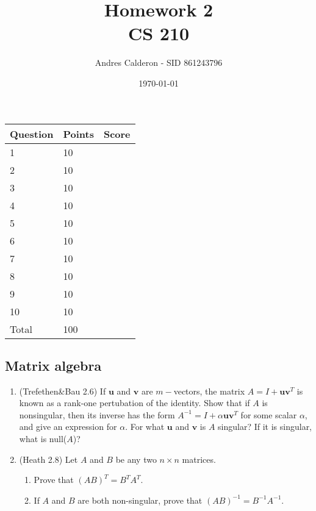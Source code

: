\documentclass{article}
\title{Homework 2\\CS 210}
\author{Andres Calderon - SID 861243796}
\date{\today}
\renewcommand{\vec}[1]{\mathbf{#1}}
\begin{document}
\maketitle

\begin{center}
\begin{tabular}{|l|l|p{.4in}|}
\hline Question & Points & Score \\
\hline 1 & 10 & \\
\hline 2 & 10 & \\
\hline 3 & 10 & \\
\hline 4 & 10 & \\
\hline 5 & 10 & \\
\hline 6 & 10 & \\
\hline 7 & 10 & \\
\hline 8 & 10 & \\
\hline 9 & 10 & \\
\hline 10 & 10 & \\
\hline Total & 100 & \\
\hline 
\end{tabular}
\end{center}

\subsection*{Matrix algebra}
\begin{enumerate}
\setcounter{enumi}{0}
\item (Trefethen\&Bau 2.6) If $\vec{u}$ and $\vec{v}$ are $m-$vectors, the matrix $A = I+\vec{u}\vec{v}^T$ is known as a rank-one
  pertubation of the identity.  Show that if $A$ is nonsingular, then its inverse has the form $A^{-1} = I + \alpha
  \vec{u} \vec{v}^T$ for some scalar $\alpha$, and give an expression for $\alpha$.  For what $\vec{u}$ and $\vec{v}$ is
  $A$ singular?  If it is singular, what is null($A$)?
\item (Heath 2.8) Let $A$ and $B$ be any two $n \times n$ matrices.
\begin{enumerate}
\item Prove that $(AB)^T=B^TA^T$.
\item If $A$ and $B$ are both non-singular, prove that $(AB)^{-1} = B^{-1}A^{-1}$.
\end{enumerate}
\end{enumerate}
\end{document}
